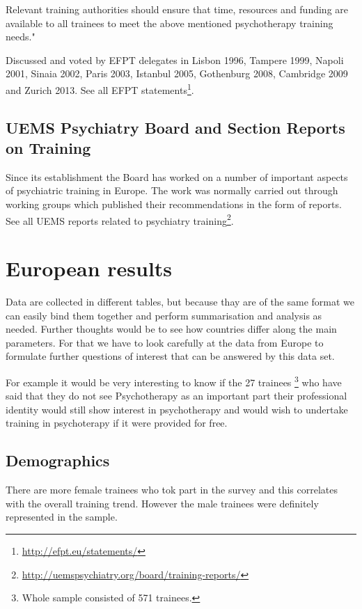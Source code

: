 \documentclass[]{tufte-handout}
\begin{document}
Relevant training authorities should ensure that time, resources and
funding are available to all trainees to meet the above mentioned
psychotherapy training needs."

Discussed and voted by EFPT delegates in Lisbon 1996, Tampere 1999,
Napoli 2001, Sinaia 2002, Paris 2003, Istanbul 2005, Gothenburg 2008,
Cambridge 2009 and Zurich 2013. See all EFPT statements\footnote{\url{http://efpt.eu/statements/}}.

\subsection{UEMS Psychiatry Board and Section Reports on
Training}\label{uems-psychiatry-board-and-section-reports-on-training}

Since its establishment the Board has worked on a number of important
aspects of psychiatric training in Europe. The work was normally carried
out through working groups which published their recommendations in the
form of reports. See all UEMS reports related to psychiatry
training\footnote{\url{http://uemspsychiatry.org/board/training-reports/}}.

\section{European results}\label{european-results}

\justify
{} Data are
collected in different tables, but because thay are of the same format
we can easily bind them together and perform summarisation and analysis
as needed. Further thoughts would be to see how countries differ along
the main parameters. For that we have to look carefully at the data from
Europe to formulate further questions of interest that can be answered
by this data set.

For example it would be very interesting to know if the 27 trainees
\footnote{Whole sample consisted of 571 trainees.} who have said that
they do not see Psychotherapy as an important part their professional
identity would still show interest in psychotherapy and would wish to
undertake training in psychoterapy if it were provided for free.

\subsection{Demographics}\label{demographics}

 There are more
female trainees who tok part in the survey and this correlates with the
overall training trend. However the male trainees were definitely
represented in the sample.
\end{document}
